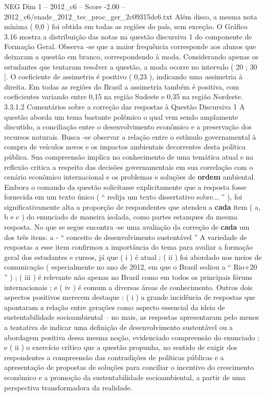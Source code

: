 \begin{textsample}{NEG Dim 1 – 2012\_c6 – Score -2.00 – 2012\_c6/enade\_2012\_tec\_proc\_ger\_2c09315dc6.txt}
Além disso, a mesma nota mínima ( 0,0 ) foi obtida em todas as regiões do país, sem exceção.
O Gráfico 3.16 mostra a distribuição das notas na questão discursiva 1 do componente de Formação Geral.
Observa -se que a maior frequência corresponde aos alunos que deixaram a questão em branco, correspondendo à moda.
Considerando apenas os estudantes que tentaram resolver a questão, a moda ocorre no intervalo ( 20 ; 30 ].
O coeficiente de assimetria é positivo ( 0,23 ), indicando uma assimetria à direita.
Em todas as regiões do Brasil a assimetria também é positiva, com coeficientes variando entre 0,15 na região Sudeste e 0,35 na região Nordeste. 3.3.1.2 Comentários sobre a correção das respostas à Questão Discursiva 1 A questão aborda um tema bastante polêmico o qual vem sendo amplamente discutido, a conciliação entre o desenvolvimento econômico e a preservação dos recursos naturais.
Busca -se observar a relação entre o estímulo governamental à compra de veículos novos e os impactos ambientais decorrentes desta política pública.
Sua compreensão implica no conhecimento de uma temática atual e na reflexão critica a respeito das decisões governamentais em sua correlação com o cenário econômico internacional e os problemas e soluções de \textbf{ordem} ambiental.
Embora o comando da questão solicitasse explicitamente que a resposta fosse fornecida em um texto único ( “ redija um texto dissertativo sobre... ” ), foi significativamente alta a proporção de respondentes que atendeu a \textbf{cada} item ( a, b e c ) do enunciado de maneira isolada, como partes estanques da mesma resposta.
No que se segue encontra -se uma avaliação da correção de \textbf{cada} um dos três itens. a - “ conceito de desenvolvimento sustentável ” A variedade de respostas a esse item confirmou a importância do tema para avaliar a formação geral dos estudantes e cursos, já que ( i ) é atual ; ( ii ) foi abordado nos meios de comunicação ( especialmente no ano de 2012, em que o Brasil sediou a “ Rio+20 ” ) ; ( iii ) é relevante não apenas no Brasil como em todos os principais fóruns internacionais ; e ( iv ) é comum a diversas áreas de conhecimento.
Outros dois aspectos positivos merecem destaque : ( i ) a grande incidência de respostas que apontaram a relação entre gerações como aspecto essencial da ideia de sustentabilidade socioambiental – no mais, as respostas apresentaram pelo menos a tentativa de indicar uma definição de desenvolvimento sustentável ou a abordagem positiva dessa mesma noção, evidenciado compreensão do enunciado ; e ( ii ) o exercício crítico que a questão propunha, no sentido de exigir dos respondentes a compreensão das contradições de políticas públicas e a apresentação de propostas de soluções para conciliar o incentivo do crescimento econômico e a promoção da sustentabilidade socioambiental, a partir de uma perspectiva transformadora da realidade.

\end{textsample}

